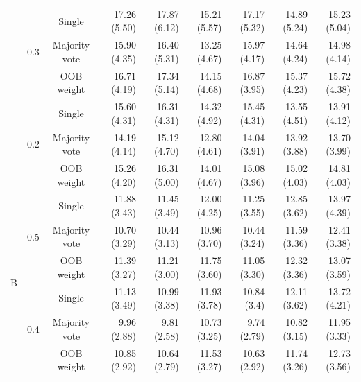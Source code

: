 \documentclass[eng]{csam}
\begin{document}
\begin{table}[ht]
\begin{tabular}{cccrrrrrr}
		\cline{2-9}
		&\multirow{3}{*}{0.3} & Single        & 17.26 (5.50) & 17.87 (6.12) & 15.21 (5.57) & 17.17 (5.32) & 14.89 (5.24) & 15.23 (5.04) \\
		&      				  & Majority vote & 15.90 (4.35) & 16.40 (5.31) & 13.25 (4.67) & 15.97 (4.17) & 14.64 (4.24) & 14.98 (4.14) \\ 
		&					  & OOB weight    & 16.71 (4.19) & 17.34 (5.14) & 14.15 (4.68) & 16.87 (3.95) & 15.37 (4.23) & 15.72 (4.38) \\ 
		\cline{2-9}
		&\multirow{3}{*}{0.2} & Single        & 15.60 (4.31) & 16.31 (4.31) & 14.32 (4.92) & 15.45 (4.31) & 13.55 (4.51) & 13.91 (4.12) \\ 
		&					  & Majority vote & 14.19 (4.14) & 15.12 (4.70) & 12.80 (4.61) & 14.04 (3.91) & 13.92 (3.88) & 13.70 (3.99) \\ 
		&					  & OOB weight    & 15.26 (4.20) & 16.31 (5.00) & 14.01 (4.67) & 15.08 (3.96) & 15.02 (4.03) & 14.81 (4.03) \\ 
		\hline
\multirow{12}{*}{B} & \multirow{3}{*}{0.5} & Single        & 11.88 (3.43) & 11.45 (3.49) & 12.00 (4.25) & 11.25 (3.55) & 12.85 (3.62) & 13.97 (4.39) \\ 
&					  & Majority vote & 10.70 (3.29) & 10.44 (3.13) & 10.96 (3.70) & 10.44 (3.24) & 11.59 (3.36) & 12.41 (3.38) \\ 
&					  & OOB weight    & 11.39 (3.27) & 11.21 (3.00) & 11.75 (3.60) & 11.05 (3.30) & 12.32 (3.36) & 13.07 (3.59) \\ 
\cline{2-9}
& \multirow{3}{*}{0.4} & Single        & 11.13 (3.49) & 10.99 (3.38) & 11.93 (3.78) & 10.84 (3.4) & 12.11 (3.62) & 13.72 (4.21) \\
&					   & Majority vote & 9.96 (2.88) & 9.81 (2.58) & 10.73 (3.25) & 9.74 (2.79) & 10.82 (3.15) & 11.95 (3.33) \\
&					   & OOB weight    & 10.85 (2.92) & 10.64 (2.79) & 11.53 (3.27) & 10.63 (2.92) & 11.74 (3.26) & 12.73 (3.56) \\ 


\end{tabular}
\end{table}
\end{document}

